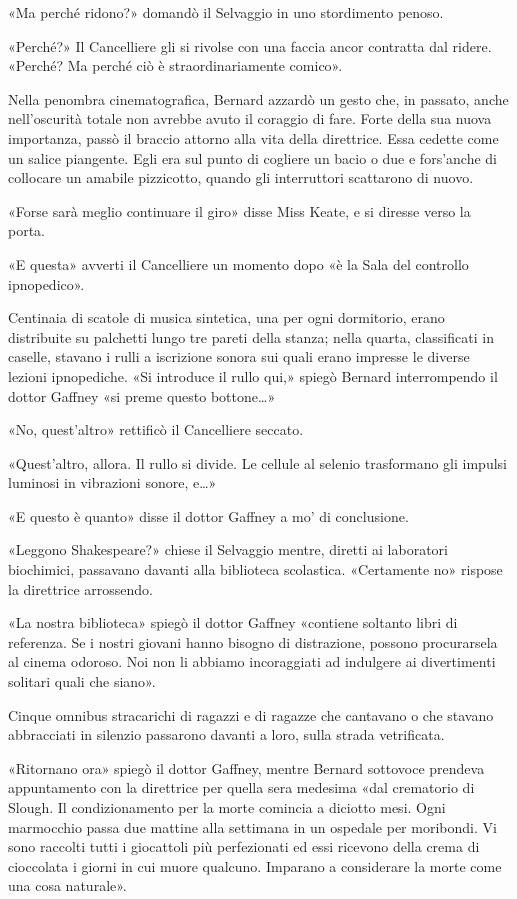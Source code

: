 \documentclass[
a5paper, %
10pt, %
twoside, 
onecolumn, %
openany, %
]{memoir}
\begin{document}
«Ma perché ridono?» domandò il Selvaggio in uno stordimento penoso.

«Perché?» Il Cancelliere gli si rivolse con una faccia ancor contratta dal ridere. «Perché? Ma perché ciò è straordinariamente comico».

Nella penombra cinematografica, Bernard azzardò un gesto che, in passato, anche nell’oscurità totale non avrebbe avuto il coraggio di fare. Forte della sua nuova importanza, passò il braccio attorno alla vita della direttrice. Essa cedette come un salice piangente. Egli era sul punto di cogliere un bacio o due e fors’anche di collocare un amabile pizzicotto, quando gli interruttori scattarono di nuovo.

«Forse sarà meglio continuare il giro» disse Miss Keate, e si diresse verso la porta.

«E questa» avverti il Cancelliere un momento dopo «è la Sala del controllo ipnopedico».

Centinaia di scatole di musica sintetica, una per ogni dormitorio, erano distribuite su palchetti lungo tre pareti della stanza; nella quarta, classificati in caselle, stavano i rulli a iscrizione sonora sui quali erano impresse le diverse lezioni ipnopediche. «Si introduce il rullo qui,» spiegò Bernard interrompendo il dottor Gaffney «si preme questo bottone…»

«No, quest’altro» rettificò il Cancelliere seccato.

«Quest’altro, allora. Il rullo si divide. Le cellule al selenio trasformano gli impulsi luminosi in vibrazioni sonore, e…»

«E questo è quanto» disse il dottor Gaffney a mo’ di conclusione.

«Leggono Shakespeare?» chiese il Selvaggio mentre, diretti ai laboratori biochimici, passavano davanti alla biblioteca scolastica. «Certamente no» rispose la direttrice arrossendo.

«La nostra biblioteca» spiegò il dottor Gaffney «contiene soltanto libri di referenza. Se i nostri giovani hanno bisogno di distrazione, possono procurarsela al cinema odoroso. Noi non li abbiamo incoraggiati ad indulgere ai divertimenti solitari quali che siano».

Cinque omnibus stracarichi di ragazzi e di ragazze che cantavano o che stavano abbracciati in silenzio passarono davanti a loro, sulla strada vetrificata.

«Ritornano ora» spiegò il dottor Gaffney, mentre Bernard sottovoce prendeva appuntamento con la direttrice per quella sera medesima «dal crematorio di Slough. Il condizionamento per la morte comincia a diciotto mesi. Ogni marmocchio passa due mattine alla settimana in un ospedale per moribondi. Vi sono raccolti tutti i giocattoli più perfezionati ed essi ricevono della crema di cioccolata i giorni in cui muore qualcuno. Imparano a considerare la morte come una cosa naturale».
\end{document}
